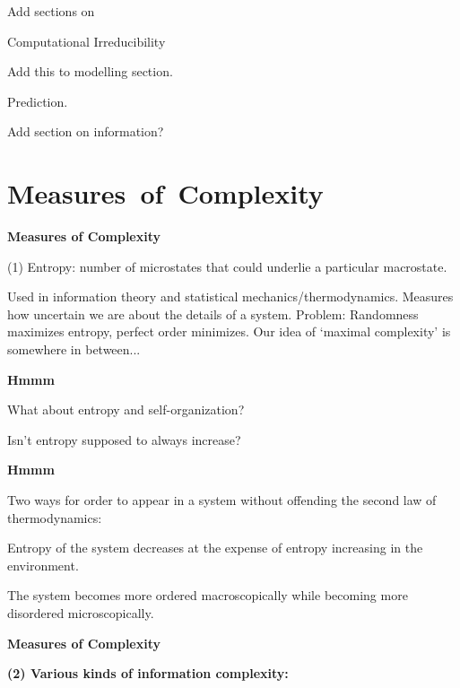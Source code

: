 Add sections on

Computational Irreducibility

Add this to modelling section.

Prediction.

Add section on information?

\section{Measures\ of\ Complexity}

  \textbf{Measures of Complexity}


  \medskip

  (1) \alert{Entropy}: number of microstates that could underlie
  a particular macrostate.

  \medskip

  
   Used in information theory and statistical mechanics/thermodynamics.
   Measures how uncertain we are about the details of a system.
   Problem: Randomness maximizes entropy, perfect order minimizes.
  Our idea of `maximal complexity' is somewhere in between...
  


  \textbf{Hmmm}


  \bigskip

  What about entropy and self-organization?

  \bigskip

  {
    Isn't entropy supposed to always increase?
  }


  \textbf{Hmmm}

  Two ways for order to appear in a system
  without offending the second law of
  thermodynamics:

  \bigskip

  {
     Entropy of the system decreases at
    the expense of entropy increasing in the
    environment.
  }

  \bigskip

  {
     The system becomes more ordered macroscopically
    while becoming more disordered microscopically.
  }


  \textbf{Measures of Complexity}

  \textbf{(2) Various kinds of information complexity: }
    
